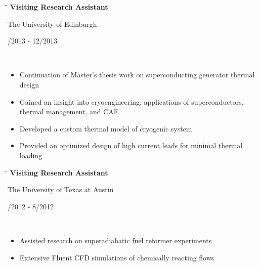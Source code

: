 \documentclass[11pt]{res}
\newcommand{\comment}[1]{}
\begin{document}
\begin{resume}
   \begin{tabbing}
   \hspace{2.7in}\= \hspace{2.3in}\= \kill %
    {\bf Visiting Research Assistant} \> \parbox[c]{6cm}{ \centering The University of Edinburgh}    \> \parbox[c]{3.3cm}{ /2013 - 12/2013} \\
   \end{tabbing}
   \vspace{-18pt}   %
	\begin{itemize}
	    \item Continuation of Master's thesis work on superconducting generator thermal design
	    \item Gained an insight into cryoengineering, applications of superconductors, thermal management, and CAE
	    \item Developed a custom thermal model of cryogenic system
	    \item Provided an optimized design of high current leads for minimal thermal loading
	\end{itemize}
\vspace{-10pt}

   \begin{tabbing}%
   \hspace{2.7in}\= \hspace{2.3in}\= \kill %
   {\bf Visiting Research Assistant}  \> \parbox[c]{6cm}{ \centering The University of Texas at Austin } \> \parbox[c]{3.3cm}{ /2012 - 8/2012}\\
   \end{tabbing}
    \vspace{-18pt}   %
    \begin{itemize}
   	\item Assisted research on superadiabatic fuel reformer experiments
   	\item Extensive Fluent CFD simulations of chemically reacting flows
   	\end{itemize}
\vspace{-10pt}

\comment{
   \begin{tabbing}
   \hspace{2.7in}\= \hspace{2.3in}\= \kill %
    {\bf Undergraduate Research Assistant} \> \parbox[c]{6cm}{ \centering The University of Edinburgh} \> \parbox[c]{3.3cm}{ \raggedleft 9/2011 - 12/2011}\\
   \end{tabbing}
   \vspace{-18pt}   %
    \begin{itemize}
   	\setlength{\leftmargin}{-10pt} \setlength\itemsep{0pt}
   	\item Created an algorithm for processing IR images subsequently used at the University College Dublin and Imperial College London
   	\end{itemize}
\vspace{-5pt}
}


\end{resume}
\end{document}
